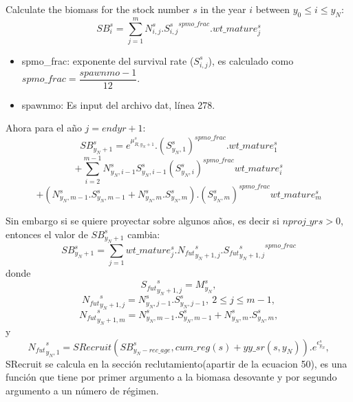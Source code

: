 \documentclass{article}
\begin{document}
Calculate the biomass for the stock number $s$ in the year $i$ between $y_0 \leq i \leq y_N$:
    \begin{equation}
    SB^s_i=\sum_{j=1}^{m}N^s_{i,j}.{S^s_{i,j}}^{spmo\_frac}.wt\_mature^s_j
\end{equation}
\begin{itemize}
    \item spmo\_frac: exponente del survival rate ($S^s_{i,j}$), es calculado como 
    $spmo\_frac=\dfrac{spawnmo-1}{12}$.
    \item spawnmo: Es input del archivo dat, línea 278.
    
\end{itemize}
Ahora para el año $j=endyr+1$:
\begin{equation}
    SB^s_{y_N+1}=e^{\mu^s_{R,y_N+1}}.(S^{s}_{y_N,1})^{spmo\_frac
    }.wt\_mature^s_1
\end{equation}
\begin{equation*}
+\sum_{i=2}^{m-1}N^{s}_{y_N,i-1}S^{s}_{y_N,i-1}(S^s_{y_N,i})^{spmo\_frac}wt\_mature^s_i
\end{equation*}
\begin{equation*}
    +(N^{s}_{y_N,m-1}.S^s_{y_N,m-1}+N^s_{y_N,m}.S^s_{y_N,m}).(S^s_{y_N,m})^{spmo\_frac}wt\_mature^s_{m}
\end{equation*}

Sin embargo si se quiere proyectar sobre algunos años, es decir si $nproj\_yrs>0$, entonces el valor de $SB^s_{y_N+1}$ cambia:
\begin{equation}
    SB^s_{y_N+1}= \sum_{j=1}wt\_mature^s_j.{N_{fut}}^s_{y_N+1,j}.{{S_{fut}}^s_{y_N+1,j}}^{spmo\_frac}
\end{equation}
donde 
\begin{equation}
    {S_{fut}}^s_{y_N+1,j}=M^s_{y_N},
\end{equation}
\begin{equation}
    {N_{fut}}^s_{y_N+1,j}=N^s_{y_N,j-1}.S^s_{y_N,j-1}, \ 2\leq j \leq m-1,
\end{equation}
\begin{equation}
    {N_{fut}}^s_{y_N+1,m}=N^s_{y_N,m-1}.S^s_{y_N,m-1}+N^s_{y_N,m}.S^s_{y_N,m},
\end{equation}
y 
\begin{equation}
    {N_{fut}}^s_{y_N,1}=SRecruit(SB^s_{y_N-rec\_age},cum\_reg(s)+yy\_sr(s,y_N)).e^{\epsilon^s_{y_N}},
\end{equation}
SRecruit se calcula en la sección reclutamiento(apartir de la ecuacion 50), es una función que tiene por primer argumento a la biomasa desovante y por segundo argumento a un número de régimen.
\end{document}
